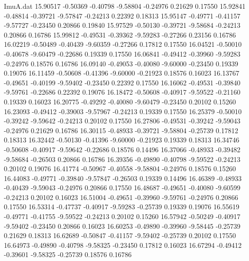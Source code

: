 \begin{filecontents}{ImuA.dat}
  15.90517   -0.50369   -0.40798   -9.58804   -0.24976    0.21629    0.17550
  15.92841   -0.48814   -0.39721   -9.57847   -0.24213    0.22392    0.18313
  15.95147   -0.49771   -0.41157   -9.57727   -0.23450    0.20866    0.19840
  15.97529   -0.50130   -0.39721   -9.58684   -0.24213    0.20866    0.16786
  15.99812   -0.49531   -0.39362   -9.59283   -0.27266    0.23156    0.16786
  16.02219   -0.50489   -0.40439   -9.60359   -0.27266    0.17812    0.17550
  16.04521   -0.50010   -0.40678   -9.60479   -0.22686    0.19339    0.17550
  16.06841   -0.49412   -0.39960   -9.59283   -0.24976    0.18576    0.16786
  16.09140   -0.49053   -0.40080   -9.60000   -0.23450    0.19339    0.19076
  16.11459   -0.50608   -0.41396   -9.60000   -0.21923    0.18576    0.16023
  16.13767   -0.49651   -0.40199   -9.59402   -0.23450    0.22392    0.17550
  16.16062   -0.49531   -0.39840   -9.59761   -0.22686    0.22392    0.19076
  16.18472   -0.50608   -0.40917   -9.59522   -0.21160    0.19339    0.16023
  16.20775   -0.49292   -0.40080   -9.60479   -0.23450    0.20102    0.15260
  16.23093   -0.49412   -0.39003   -9.57967   -0.24213    0.19339    0.17550
  16.25379   -0.50010   -0.39242   -9.59642   -0.24213    0.20102    0.17550
  16.27806   -0.49531   -0.39242   -9.59043   -0.24976    0.21629    0.16786
  16.30115   -0.48933   -0.39721   -9.58804   -0.25739    0.17812    0.18313
  16.32442   -0.50130   -0.41396   -9.60000   -0.21923    0.19339    0.18313
  16.34746   -0.50608   -0.40917   -9.59642   -0.22686    0.18576    0.14496
  16.37066   -0.48933   -0.39482   -9.58684   -0.26503    0.20866    0.16786
  16.39356   -0.49890   -0.40798   -9.59522   -0.24213    0.20102    0.19076
  16.41774   -0.50967   -0.40558   -9.58804   -0.24976    0.18576    0.15260
  16.44083   -0.49771   -0.39840   -9.57847   -0.26503    0.19339    0.14496
  16.46389   -0.48933   -0.40439   -9.59043   -0.24976    0.20866    0.17550
  16.48687   -0.49651   -0.40080   -9.60599   -0.24213    0.20102    0.16023
  16.51004   -0.49651   -0.39960   -9.59761   -0.24976    0.20866    0.17550
  16.53314   -0.47737   -0.40917   -9.59283   -0.25739    0.19339    0.19076
  16.55619   -0.49771   -0.41755   -9.59522   -0.24213    0.20102    0.15260
  16.57942   -0.50249   -0.40917   -9.59402   -0.23450    0.20866    0.16023
  16.60253   -0.49890   -0.39960   -9.58445   -0.25739    0.21629    0.18313
  16.62689   -0.50847   -0.41157   -9.59402   -0.25739    0.20102    0.17550
  16.64973   -0.49890   -0.40798   -9.58325   -0.23450    0.17812    0.16023
  16.67294   -0.49412   -0.39601   -9.58325   -0.25739    0.18576    0.16786

\end{filecontents}
